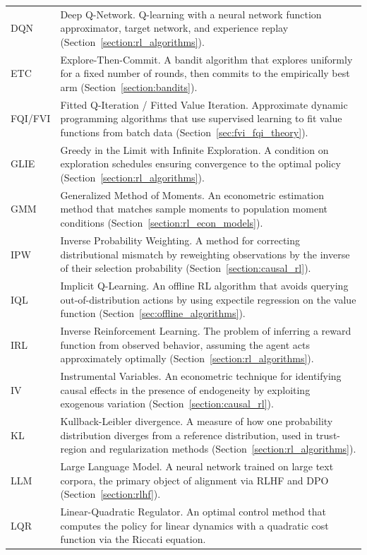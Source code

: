 \begin{longtable}{p{2.2cm} p{12cm}}
DQN & Deep Q-Network. Q-learning with a neural network function approximator, target network, and experience replay (Section~\ref{section:rl_algorithms}). \\[4pt]
ETC & Explore-Then-Commit. A bandit algorithm that explores uniformly for a fixed number of rounds, then commits to the empirically best arm (Section~\ref{section:bandits}). \\[4pt]
FQI/FVI & Fitted Q-Iteration / Fitted Value Iteration. Approximate dynamic programming algorithms that use supervised learning to fit value functions from batch data (Section~\ref{sec:fvi_fqi_theory}). \\[4pt]
GLIE & Greedy in the Limit with Infinite Exploration. A condition on exploration schedules ensuring convergence to the optimal policy (Section~\ref{section:rl_algorithms}). \\[4pt]
GMM & Generalized Method of Moments. An econometric estimation method that matches sample moments to population moment conditions (Section~\ref{section:rl_econ_models}). \\[4pt]
IPW & Inverse Probability Weighting. A method for correcting distributional mismatch by reweighting observations by the inverse of their selection probability (Section~\ref{section:causal_rl}). \\[4pt]
IQL & Implicit Q-Learning. An offline RL algorithm that avoids querying out-of-distribution actions by using expectile regression on the value function (Section~\ref{sec:offline_algorithms}). \\[4pt]
IRL & Inverse Reinforcement Learning. The problem of inferring a reward function from observed behavior, assuming the agent acts approximately optimally (Section~\ref{section:rl_algorithms}). \\[4pt]
IV & Instrumental Variables. An econometric technique for identifying causal effects in the presence of endogeneity by exploiting exogenous variation (Section~\ref{section:causal_rl}). \\[4pt]
KL & Kullback-Leibler divergence. A measure of how one probability distribution diverges from a reference distribution, used in trust-region and regularization methods (Section~\ref{section:rl_algorithms}). \\[4pt]
LLM & Large Language Model. A neural network trained on large text corpora, the primary object of alignment via RLHF and DPO (Section~\ref{section:rlhf}). \\[4pt]
LQR & Linear-Quadratic Regulator. An optimal control method that computes the policy for linear dynamics with a quadratic cost function via the Riccati equation. \\[4pt]

\end{longtable}
